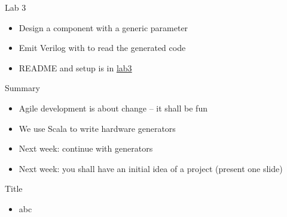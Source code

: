 \begin{frame}[fragile]{Lab 3}
\begin{itemize}
\item Design a component with a generic parameter
\item Emit Verilog with  to read the generated code
\item README and setup is in \href{https://github.com/schoeberl/agile-hw/tree/main/lab3}{lab3}
\end{itemize}
\end{frame}


\begin{frame}[fragile]{Summary}
\begin{itemize}
\item Agile development is about change -- it shall be fun
\item We use Scala to write hardware generators
\item Next week: continue with generators
\item Next week: you shall have an initial idea of a project (present one slide)
\end{itemize}
\end{frame}


\begin{frame}[fragile]{Title}
\begin{itemize}
\item abc
\end{itemize}
\end{frame}
